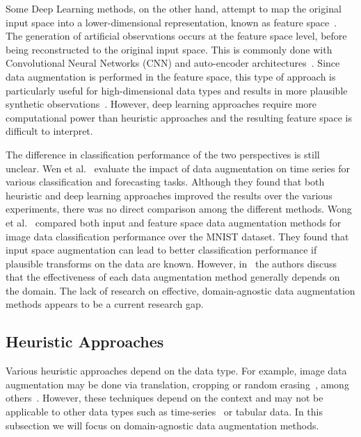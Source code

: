 \documentclass[parskip=full]{scrartcl}
\begin{document}
Some Deep Learning methods, on the other hand, attempt to map the original
input space into a lower-dimensional representation, known as feature
space~\cite{DeVries2017}. The generation of artificial observations occurs at
the feature space level, before being reconstructed to the original input
space. This is commonly done with Convolutional Neural Networks (CNN) and
auto-encoder architectures~\cite{Shorten2019}. Since data augmentation is
performed in the feature space, this type of approach is particularly useful
for high-dimensional data types and results in more plausible synthetic
observations~\cite{DeVries2017}. However, deep learning approaches require
more computational power than heuristic approaches and the resulting feature
space is difficult to interpret.

The difference in classification performance of the two perspectives is still
unclear. Wen et al.~\cite{Wen2020} evaluate the impact of data augmentation on
time series for various classification and forecasting tasks. Although they
found that both heuristic and deep learning approaches improved the results
over the various experiments, there was no direct comparison among the
different methods. Wong et al.~\cite{Wong2016} compared both input and feature
space data augmentation methods for image data classification performance over
the MNIST dataset. They found that input space augmentation can lead to better
classification performance if plausible transforms on the data are known.
However, in~\cite{DeVries2017} the authors discuss that the effectiveness of
each data augmentation method generally depends on the domain. The lack of
research on effective, domain-agnostic data augmentation methods appears to be
a current research gap.

\subsection{Heuristic Approaches}

Various heuristic approaches depend on the data type. For example, image data
augmentation may be done via translation, cropping or random
erasing~\cite{Zhong2017}, among others~\cite{Shorten2019}. However, these
techniques depend on the context and may not be applicable to other data types
such as time-series~\cite{Wen2020, Iwana2021} or tabular data. In this
subsection we will focus on domain-agnostic data augmentation methods.
\end{document}
